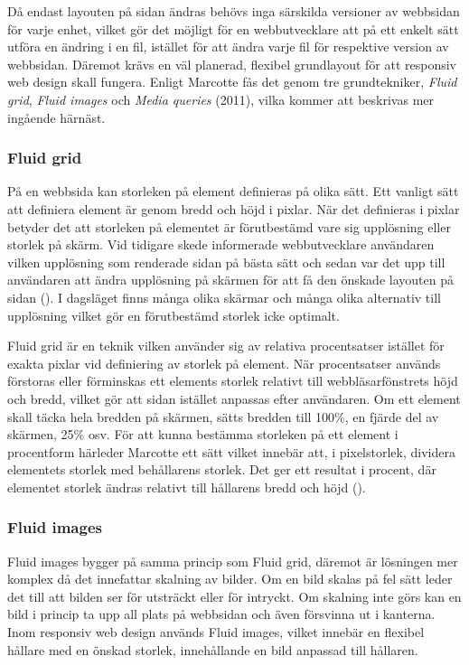\documentclass[11pt]{article}
\begin{document}
Då endast layouten på sidan ändras behövs inga särskilda versioner av webbsidan för varje enhet, vilket gör det möjligt för en webbutvecklare att på ett enkelt sätt utföra en ändring i en fil, istället för att ändra varje fil för respektive version av webbsidan. Däremot krävs en väl planerad, flexibel grundlayout för att responsiv web design skall fungera. Enligt Marcotte fås det genom tre grundtekniker, \textit{Fluid grid}, \textit{Fluid images} och \textit{Media queries} (2011), vilka kommer att beskrivas mer ingående härnäst.

\subsubsection{Fluid grid}
På en webbsida kan storleken på element definieras på olika sätt. Ett vanligt sätt att definiera element är genom bredd och höjd i pixlar. När det definieras i pixlar betyder det att storleken på elementet är förutbestämd vare sig upplösning eller storlek på skärm. Vid tidigare skede informerade webbutvecklare användaren vilken upplösning som renderade sidan på bästa sätt och sedan var det upp till användaren att ändra upplösning på skärmen för att få den önskade layouten på sidan (\cite[s. 6]{resp}). I dagsläget finns många olika skärmar och många olika alternativ till upplösning vilket gör en förutbestämd storlek icke optimalt. 

Fluid grid är en teknik vilken använder sig av relativa procentsatser istället för exakta pixlar vid definiering av storlek på element. När procentsatser används förstoras eller förminskas ett elements storlek relativt till webbläsarfönstrets höjd och bredd, vilket gör att sidan istället anpassas efter användaren. Om ett element skall täcka hela bredden på skärmen, sätts bredden till 100\%, en fjärde del av skärmen, 25\% osv. 
För att kunna bestämma storleken på ett element i procentform härleder Marcotte ett sätt vilket innebär att, i pixelstorlek, dividera elementets storlek med behållarens storlek. Det ger ett resultat i procent, där elementet storlek ändras relativt till hållarens bredd och höjd (\cite[s. 23]{resp}).

\subsubsection{Fluid images}
Fluid images bygger på samma princip som Fluid grid, däremot är lösningen mer komplex då det innefattar skalning av bilder. Om en bild skalas på fel sätt leder det till att bilden ser för utsträckt eller för intryckt. Om skalning inte görs kan en bild i princip ta upp all plats på webbsidan och även försvinna ut i kanterna. Inom responsiv web design används Fluid images, vilket innebär en flexibel hållare med en önskad storlek, innehållande en bild anpassad till hållaren.  
\end{document}
